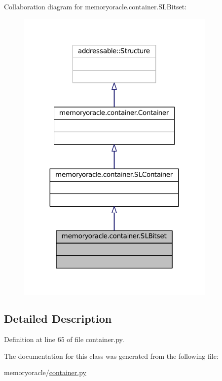 Collaboration diagram for memoryoracle.\+container.\+S\+L\+Bitset\+:\nopagebreak
\begin{figure}[H]
\begin{center}
\leavevmode
\includegraphics[width=275pt]{classmemoryoracle_1_1container_1_1SLBitset__coll__graph}
\end{center}
\end{figure}


\subsection{Detailed Description}


Definition at line 65 of file container.\+py.



The documentation for this class was generated from the following file\+:\begin{DoxyCompactItemize}
\item 
memoryoracle/\hyperlink{container_8py}{container.\+py}\end{DoxyCompactItemize}
